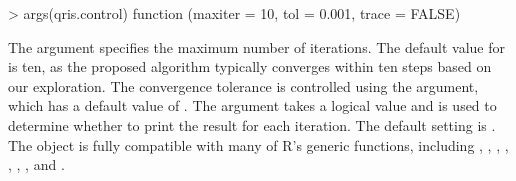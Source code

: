 \begin{example}
  > args(qris.control)
  function (maxiter = 10, tol = 0.001, trace = FALSE) 
\end{example}
% 

The  argument specifies the maximum number of iterations. 
The default value for  is ten, 
as the proposed algorithm typically converges within ten steps based on our exploration.
The convergence tolerance is controlled using the  argument, 
which has a default value of .
The  argument takes a logical value and 
is used to determine whether to print the result for each iteration. 
The default setting is .
The  object is fully compatible with many of R's generic functions, 
including , , , , 
, , , and .


